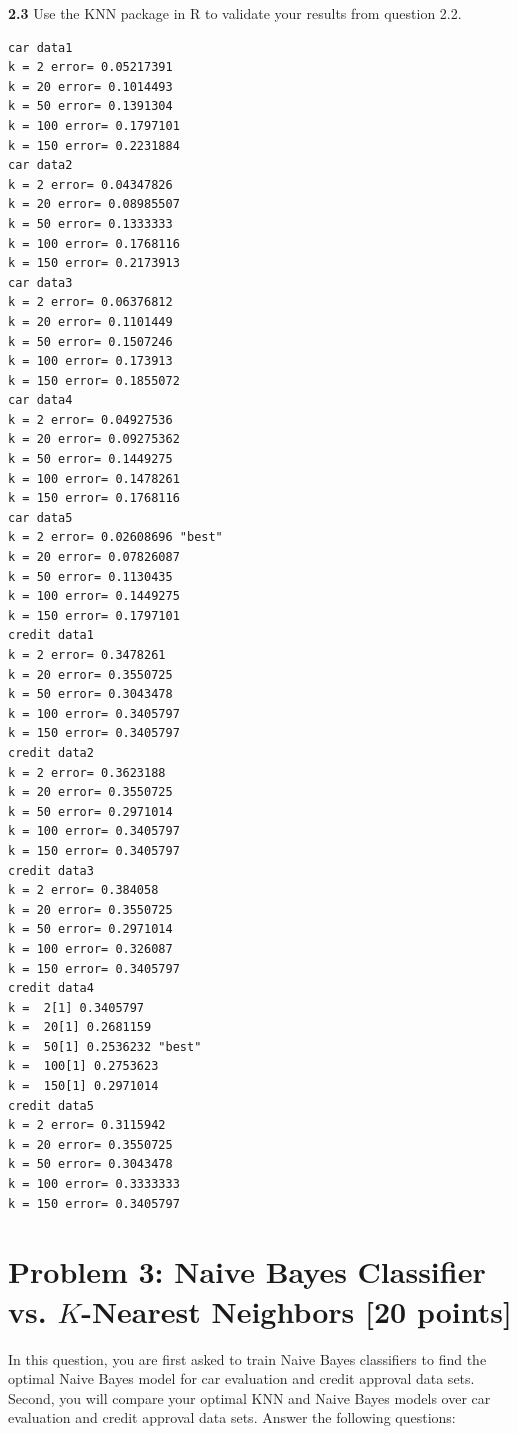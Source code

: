 \documentclass{article}
\begin{document}
\textbf{2.3} Use the KNN package in R  to validate your results from question 2.2.
\begin{lstlisting}
car data1
k = 2 error= 0.05217391
k = 20 error= 0.1014493 
k = 50 error= 0.1391304 
k = 100 error= 0.1797101 
k = 150 error= 0.2231884 
car data2
k = 2 error= 0.04347826 
k = 20 error= 0.08985507 
k = 50 error= 0.1333333 
k = 100 error= 0.1768116 
k = 150 error= 0.2173913 
car data3
k = 2 error= 0.06376812 
k = 20 error= 0.1101449 
k = 50 error= 0.1507246 
k = 100 error= 0.173913 
k = 150 error= 0.1855072 
car data4
k = 2 error= 0.04927536 
k = 20 error= 0.09275362 
k = 50 error= 0.1449275 
k = 100 error= 0.1478261 
k = 150 error= 0.1768116 
car data5
k = 2 error= 0.02608696 "best"
k = 20 error= 0.07826087 
k = 50 error= 0.1130435 
k = 100 error= 0.1449275 
k = 150 error= 0.1797101 
credit data1
k = 2 error= 0.3478261 
k = 20 error= 0.3550725 
k = 50 error= 0.3043478
k = 100 error= 0.3405797 
k = 150 error= 0.3405797 
credit data2
k = 2 error= 0.3623188 
k = 20 error= 0.3550725
k = 50 error= 0.2971014
k = 100 error= 0.3405797 
k = 150 error= 0.3405797
credit data3
k = 2 error= 0.384058 
k = 20 error= 0.3550725 
k = 50 error= 0.2971014 
k = 100 error= 0.326087 
k = 150 error= 0.3405797 
credit data4
k =  2[1] 0.3405797
k =  20[1] 0.2681159
k =  50[1] 0.2536232 "best"
k =  100[1] 0.2753623
k =  150[1] 0.2971014
credit data5
k = 2 error= 0.3115942 
k = 20 error= 0.3550725 
k = 50 error= 0.3043478 
k = 100 error= 0.3333333 
k = 150 error= 0.3405797
\end{lstlisting}
\section*{Problem 3: Naive Bayes Classifier vs. $K$-Nearest Neighbors [20 points]} 

In this question, you are  first asked to train Naive Bayes classifiers to find the optimal Naive Bayes model for  car evaluation and credit approval data sets. Second, you will  compare your optimal KNN and Naive Bayes models over  car evaluation and credit approval data sets.  Answer the following questions:
\end{document}
